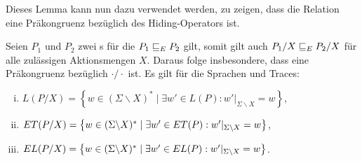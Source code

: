 Dieses Lemma kann nun dazu verwendet werden, zu zeigen, dass die Relation
\ERel{} eine Präkongruenz bezüglich des Hiding-Operators ist.

\begin{Satz}
  \label{FehlerHidingSatz}
  Seien $P_1$ und $P_2$ zwei \MEIO{}s für die $P_1 \sqsubseteq  _E P_2$ gilt, somit gilt
  auch $P_1/X \sqsubseteq  _E P_2/X$ für alle zulässigen Aktionsmengen $X$. Daraus folge
  insbesondere, dass \ERel{} eine Präkongruenz bezüglich $\cdot /\cdot$ ist. Es
  gilt für die Sprachen und Traces:
  \begin{enumerate}[(i)]
    \item $L(P/X) = \left\{w\in (\Sigma\backslash X)^*\mid \exists w'\in L(P):
      w'|_{\Sigma\backslash X} = w\right\}$,
    \item $ET (P/X) = \left\{w\in (\Sigma\backslash X)^*\mid \exists w'\in
      ET(P): w'|_{\Sigma\backslash X} = w\right\}$,
    \item $EL (P/X) = \left\{w\in (\Sigma\backslash X)^*\mid \exists w'\in
      EL(P): w'|_{\Sigma\backslash X} = w\right\}$.
  \end{enumerate}
\end{Satz}
